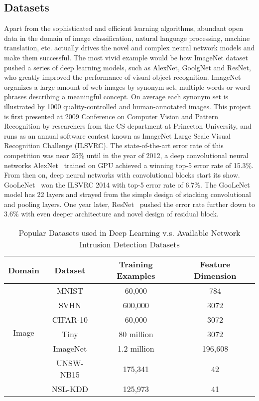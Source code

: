\subsection{Datasets}
Apart from the sophisticated and efficient learning algorithms,
abundant open data in the domain of image classification, natural language processing, machine translation, etc.
actually drives the novel and complex neural network models and make them successful.
The most vivid example would be how ImageNet dataset~\cite{ImageNet} pushed a series of deep learning models,
such as AlexNet, GoolgNet and ResNet, who greatly improved the performance of visual object recognition.
ImageNet organizes a large amount of web images by synonym set, multiple words or word phrases
describing a meaningful concept.
On average each synonym set is illustrated by 1000 quality-controlled and human-annotated images.
This project is first presented at 2009 Conference on Computer Vision and Pattern Recognition by researchers
from the CS department at Princeton University, and runs as an annual software contest known as
ImageNet Large Scale Visual Recognition Challenge (ILSVRC).
The state-of-the-art error rate of this competition was near 25\% until in the year of 2012,
a deep convolutional neural networks AlexNet~\cite{AlexNet} trained on GPU achieved a winning top-5 error rate of 15.3\%.
From then on, deep neural networks with convolutional blocks start its show.
GooLeNet~\cite{GoogLeNet} won the ILSVRC 2014 with top-5 error rate of 6.7\%.
The GooLeNet model has 22 layers and strayed from the simple design of stacking convolutional and pooling layers.
One year later, ResNet~\cite{ResNet} pushed the error rate further down to 3.6\% with even deeper architecture and novel design of residual block.

\begin{table}[]
\centering
\caption{Popular Datasets used in Deep Learning v.s. Available Network Intrusion Detection Datasets}
\label{Tab:Datasets}
\begin{tabular}{c|c|c|c}
\multicolumn{1}{c|}{Domain}                          & Dataset       & Training Examples & Feature Dimension \\
\hline
\hline
\multirow{6}{*}{Image}                               & MNIST         & 60,000        & 784     \\
                                                     & SVHN          & 600,000       & 3072    \\
                                                     & CIFAR-10      & 60,000        & 3072    \\
                                                     & Tiny          & 80 million    & 3072    \\
                                                     & ImageNet      & 1.2 million   & 196,608 \\
\hline
\multicolumn{1}{c|}{\multirow{2}{*}{IDS}}            & UNSW-NB15     & 175,341       & 42      \\
\multicolumn{1}{l|}{}                                & NSL-KDD       & 125,973       & 41      
\end{tabular}
\end{table}

